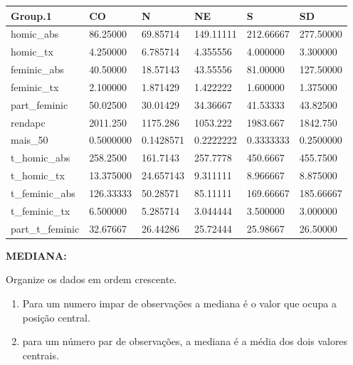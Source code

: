 \documentclass[
  letterpaper,
  DIV=11,
  numbers=noendperiod]{scrreprt}
\newenvironment{Shaded}{\begin{snugshade}}{\end{snugshade}}
\newcommand{\FunctionTok}[1]{\textcolor[rgb]{0.28,0.35,0.67}{#1}}
\newcommand{\NormalTok}[1]{\textcolor[rgb]{0.00,0.23,0.31}{#1}}
\newcommand{\SpecialCharTok}[1]{\textcolor[rgb]{0.37,0.37,0.37}{#1}}
\begin{document}
\begin{table}
\centering
\begin{tabular}[t]{l|l|l|l|l|l}
\hline
Group.1 & CO & N & NE & S & SD\\
\hline
homic\_abs & 86.25000 & 69.85714 & 149.11111 & 212.66667 & 277.50000\\
\hline
homic\_tx & 4.250000 & 6.785714 & 4.355556 & 4.000000 & 3.300000\\
\hline
feminic\_abs & 40.50000 & 18.57143 & 43.55556 & 81.00000 & 127.50000\\
\hline
feminic\_tx & 2.100000 & 1.871429 & 1.422222 & 1.600000 & 1.375000\\
\hline
part\_feminic & 50.02500 & 30.01429 & 34.36667 & 41.53333 & 43.82500\\
\hline
rendapc & 2011.250 & 1175.286 & 1053.222 & 1983.667 & 1842.750\\
\hline
mais\_50 & 0.5000000 & 0.1428571 & 0.2222222 & 0.3333333 & 0.2500000\\
\hline
t\_homic\_abs & 258.2500 & 161.7143 & 257.7778 & 450.6667 & 455.7500\\
\hline
t\_homic\_tx & 13.375000 & 24.657143 & 9.311111 & 8.966667 & 8.875000\\
\hline
t\_feminic\_abs & 126.33333 & 50.28571 & 85.11111 & 169.66667 & 185.66667\\
\hline
t\_feminic\_tx & 6.500000 & 5.285714 & 3.044444 & 3.500000 & 3.000000\\
\hline
part\_t\_feminic & 32.67667 & 26.44286 & 25.72444 & 25.98667 & 26.50000\\
\hline
\end{tabular}
\end{table}

\textbf{MEDIANA:}

Organize os dados em ordem crescente.

\begin{enumerate}
\def\labelenumi{\alph{enumi})}
\item
  Para um numero impar de observações a mediana é o valor que ocupa a
  posição central.
\item
  para um número par de observações, a mediana é a média dos dois
  valores centrais.
\end{enumerate}

\begin{Shaded}
\end{Shaded}
\end{document}
